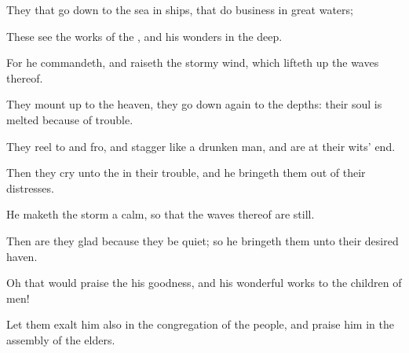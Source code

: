 {\Q {}They that go
down to the
sea in
ships, that
do
business in
great
waters;


\par }{\Q {}These
see the
works of the
{}, and his
wonders in the
deep.


\par }{\Q {}For he
commandeth, and
raiseth the
stormy
wind, which lifteth
up the
waves thereof.


\par }{\Q {}They mount
up to the
heaven, they go
down again to the
depths: their
soul is
melted because of
trouble.


\par }{\Q {}They reel to and
fro, and
stagger like a drunken
man, and are at their
wits’
end.


\par }{\Q {}Then they
cry unto the
{} in their
trouble, and he bringeth them
out of their
distresses.


\par }{\Q {}He
maketh the
storm a
calm, so that the
waves thereof are
still.


\par }{\Q {}Then are they
glad because they be
quiet; so he
bringeth them unto their
desired
haven.


\par }{\Q {}Oh that
{} would
praise the
{}
{} his
goodness, and
{} his wonderful
works to the
children of
men!


\par }{\Q {}Let them
exalt him also in the
congregation of the
people, and
praise him in the
assembly of the
elders.


\par }{\BB \par }
